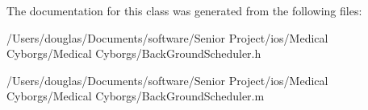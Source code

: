The documentation for this class was generated from the following files\-:\begin{DoxyCompactItemize}
\item 
/\-Users/douglas/\-Documents/software/\-Senior Project/ios/\-Medical Cyborgs/\-Medical Cyborgs/Back\-Ground\-Scheduler.\-h\item 
/\-Users/douglas/\-Documents/software/\-Senior Project/ios/\-Medical Cyborgs/\-Medical Cyborgs/Back\-Ground\-Scheduler.\-m\end{DoxyCompactItemize}
